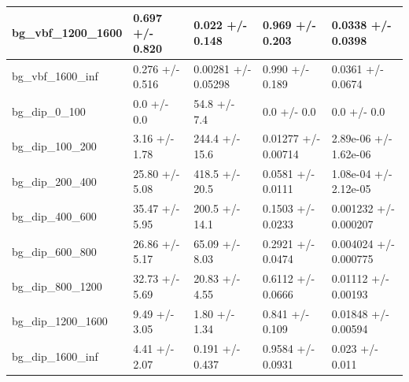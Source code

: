 \documentclass[a4paper, 10pt]{article}
\begin{document}
\begin{table}[H]
\begin{center}
\begin{tabular}{|m{20.0mm}|m{27.0mm}|m{27.0mm}|m{33.0mm}|m{32.0mm}|}
      \hline
      {\cellcolor{white}         bg\_vbf\_1200\_1600}& {\cellcolor{white}         0.697 +/\-- 0.820}& {\cellcolor{white}         0.022 +/\-- 0.148}& {\cellcolor{white}         0.969 +/\-- 0.203}& {\cellcolor{white}         0.0338 +/\-- 0.0398}\\
      \hline
      {\cellcolor{white}         bg\_vbf\_1600\_inf}& {\cellcolor{white}         0.276 +/\-- 0.516}& {\cellcolor{white}         0.00281 +/\-- 0.05298}& {\cellcolor{white}         0.990 +/\-- 0.189}& {\cellcolor{white}         0.0361 +/\-- 0.0674}\\
      \hline
      {\cellcolor{white}         bg\_dip\_0\_100}& {\cellcolor{white}         0.0 +/\-- 0.0}& {\cellcolor{white}         54.8 +/\-- 7.4}& {\cellcolor{white}         0.0 +/\-- 0.0}& {\cellcolor{white}         0.0 +/\-- 0.0}\\
      \hline
      {\cellcolor{white}         bg\_dip\_100\_200}& {\cellcolor{white}         3.16 +/\-- 1.78}& {\cellcolor{white}         244.4 +/\-- 15.6}& {\cellcolor{white}         0.01277 +/\-- 0.00714}& {\cellcolor{white}         2.89e-06 +/\-- 1.62e-06}\\
      \hline
      {\cellcolor{white}         bg\_dip\_200\_400}& {\cellcolor{white}         25.80 +/\-- 5.08}& {\cellcolor{white}         418.5 +/\-- 20.5}& {\cellcolor{white}         0.0581 +/\-- 0.0111}& {\cellcolor{white}         1.08e-04 +/\-- 2.12e-05}\\
      \hline
      {\cellcolor{white}         bg\_dip\_400\_600}& {\cellcolor{white}         35.47 +/\-- 5.95}& {\cellcolor{white}         200.5 +/\-- 14.1}& {\cellcolor{white}         0.1503 +/\-- 0.0233}& {\cellcolor{white}         0.001232 +/\-- 0.000207}\\
      \hline
      {\cellcolor{white}         bg\_dip\_600\_800}& {\cellcolor{white}         26.86 +/\-- 5.17}& {\cellcolor{white}         65.09 +/\-- 8.03}& {\cellcolor{white}         0.2921 +/\-- 0.0474}& {\cellcolor{white}         0.004024 +/\-- 0.000775}\\
      \hline
      {\cellcolor{white}         bg\_dip\_800\_1200}& {\cellcolor{white}         32.73 +/\-- 5.69}& {\cellcolor{white}         20.83 +/\-- 4.55}& {\cellcolor{white}         0.6112 +/\-- 0.0666}& {\cellcolor{white}         0.01112 +/\-- 0.00193}\\
      \hline
      {\cellcolor{white}         bg\_dip\_1200\_1600}& {\cellcolor{white}         9.49 +/\-- 3.05}& {\cellcolor{white}         1.80 +/\-- 1.34}& {\cellcolor{white}         0.841 +/\-- 0.109}& {\cellcolor{white}         0.01848 +/\-- 0.00594}\\
      \hline
      {\cellcolor{white}         bg\_dip\_1600\_inf}& {\cellcolor{white}         4.41 +/\-- 2.07}& {\cellcolor{white}         0.191 +/\-- 0.437}& {\cellcolor{white}         0.9584 +/\-- 0.0931}& {\cellcolor{white}         0.023 +/\-- 0.011}\\
\hline
    \end{tabular}
  \end{center}
\end{table}
\end{document}
